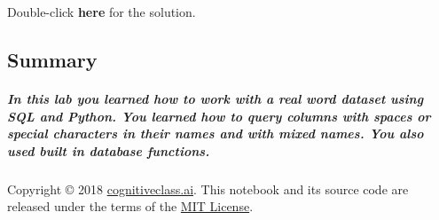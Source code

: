 \documentclass[11pt]{article}
\begin{document}
    Double-click \textbf{here} for the solution.

    \subsection{Summary}\label{summary}

\subparagraph{In this lab you learned how to work with a real word
dataset using SQL and Python. You learned how to query columns with
spaces or special characters in their names and with mixed names. You
also used built in database
functions.}\label{in-this-lab-you-learned-how-to-work-with-a-real-word-dataset-using-sql-and-python.-you-learned-how-to-query-columns-with-spaces-or-special-characters-in-their-names-and-with-mixed-names.-you-also-used-built-in-database-functions.}

    Copyright © 2018
\href{cognitiveclass.ai?utm_source=bducopyrightlink\&utm_medium=dswb\&utm_campaign=bdu}{cognitiveclass.ai}.
This notebook and its source code are released under the terms of the
\href{https://bigdatauniversity.com/mit-license/}{MIT License}.


    
    
    
    
\end{document}
